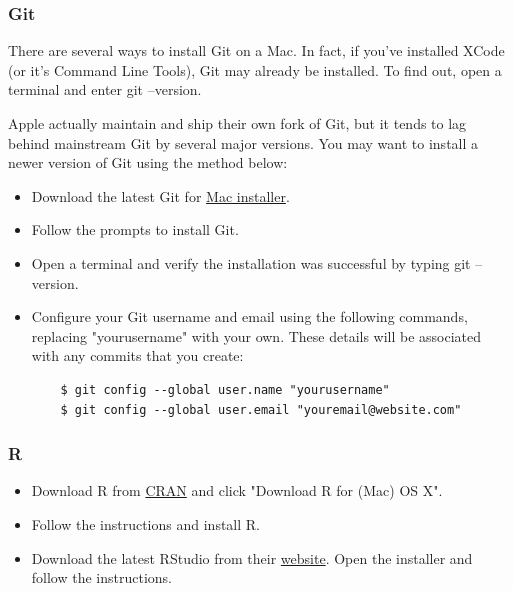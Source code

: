 \documentclass[10pt]{article} %
\begin{document}
\subsubsection{Git}

There are several ways to install Git on a Mac.
In fact, if you've installed XCode (or it's Command Line Tools), Git may already be installed.
To find out, open a terminal and enter git --version.

Apple actually maintain and ship their own fork of Git, but it tends to lag behind mainstream Git by several major versions.
You may want to install a newer version of Git using the method below:
\begin{itemize}
  \item Download the latest Git for \href{https://git-scm.com/download/mac}{Mac installer}.
  \item Follow the prompts to install Git.
  \item Open a terminal and verify the installation was successful by typing git --version.
  \item Configure your Git username and email using the following commands, replacing "yourusername" with your own.
  These details will be associated with any commits that you create:
  \begin{lstlisting}
    $ git config --global user.name "yourusername"
    $ git config --global user.email "youremail@website.com"
  \end{lstlisting}
\end{itemize}

\subsubsection{R}

\begin{itemize}
  \item Download R from \href{http://cran.us.r-project.org/}{CRAN} and click "Download R for (Mac) OS X".
  \item Follow the instructions and install R.
  \item Download the latest RStudio from their \href{https://www.rstudio.com/products/rstudio/download/}{website}.
  Open the installer and follow the instructions.
\end{itemize}







%
\end{document}
